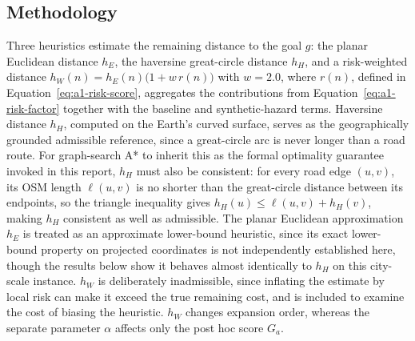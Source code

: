 \documentclass{ai-lab-report}
\begin{document}
\subsection{Methodology}
Three heuristics estimate the remaining distance to the goal $g$: the planar Euclidean distance $h_E$, the haversine great-circle distance $h_H$, and a risk-weighted distance $h_W(n)=h_E(n)\big(1+w\,r(n)\big)$ with $w=2.0$, where $r(n)$, defined in Equation~\eqref{eq:a1-risk-score}, aggregates the contributions from Equation~\eqref{eq:a1-risk-factor} together with the baseline and synthetic-hazard terms. Haversine distance $h_H$, computed on the Earth's curved surface, serves as the geographically grounded admissible reference, since a great-circle arc is never longer than a road route. For graph-search A* to inherit this as the formal optimality guarantee invoked in this report, $h_H$ must also be consistent: for every road edge $(u,v)$, its OSM length $\ell(u,v)$ is no shorter than the great-circle distance between its endpoints, so the triangle inequality gives $h_H(u)\le \ell(u,v)+h_H(v)$, making $h_H$ consistent as well as admissible. The planar Euclidean approximation $h_E$ is treated as an approximate lower-bound heuristic, since its exact lower-bound property on projected coordinates is not independently established here, though the results below show it behaves almost identically to $h_H$ on this city-scale instance. $h_W$ is deliberately inadmissible, since inflating the estimate by local risk can make it exceed the true remaining cost, and is included to examine the cost of biasing the heuristic. $h_W$ changes expansion order, whereas the separate parameter $\alpha$ affects only the post hoc score $G_a$.
\end{document}
